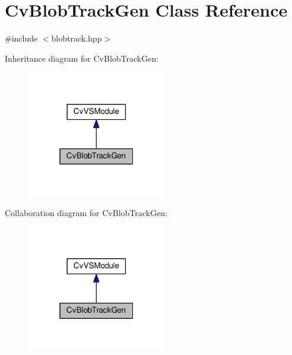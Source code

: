 \hypertarget{classCvBlobTrackGen}{\section{Cv\-Blob\-Track\-Gen Class Reference}
\label{classCvBlobTrackGen}
}


{\ttfamily \#include $<$blobtrack.\-hpp$>$}



Inheritance diagram for Cv\-Blob\-Track\-Gen\-:\nopagebreak
\begin{figure}[H]
\begin{center}
\leavevmode
\includegraphics[width=172pt]{classCvBlobTrackGen__inherit__graph}
\end{center}
\end{figure}


Collaboration diagram for Cv\-Blob\-Track\-Gen\-:\nopagebreak
\begin{figure}[H]
\begin{center}
\leavevmode
\includegraphics[width=172pt]{classCvBlobTrackGen__coll__graph}
\end{center}
\end{figure}
